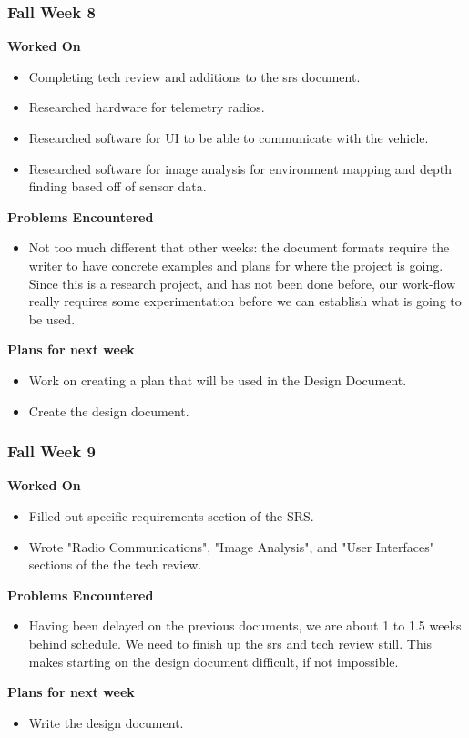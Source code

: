 \documentclass[compsoc,draftclsnofoot,onecolumn,10pt]{IEEEtran}
\begin{document}
\subsubsection*{Fall Week 8}
\textbf{Worked On}
\begin{itemize}
    \item Completing tech review and additions to the srs document.
    \item Researched hardware for telemetry radios.
    \item Researched software for UI to be able to communicate with the vehicle.
    \item Researched software for image analysis for environment mapping and depth finding based off of sensor data.
\end{itemize}
\textbf{Problems Encountered}
\begin{itemize}
    \item Not too much different that other weeks: the document formats require the writer to have concrete examples and plans for where the project is going. Since this is a research project, and has not been done before, our work-flow really requires some experimentation before we can establish what is going to be used.
\end{itemize}
\textbf{Plans for next week}
\begin{itemize}
    \item Work on creating a plan that will be used in the Design Document.
    \item Create the design document.
\end{itemize}


\subsubsection*{Fall Week 9}
\textbf{Worked On}
\begin{itemize}
    \item Filled out specific requirements section of the SRS.
    \item Wrote "Radio Communications", "Image Analysis", and "User Interfaces" sections of the the tech review.
\end{itemize}
\textbf{Problems Encountered}
\begin{itemize}
    \item Having been delayed on the previous documents, we are about 1 to 1.5 weeks behind schedule. We need to finish up the srs and tech review still. This makes starting on the design document difficult, if not impossible.
\end{itemize}
\textbf{Plans for next week}
\begin{itemize}
    \item Write the design document.
\end{itemize}
\end{document}
